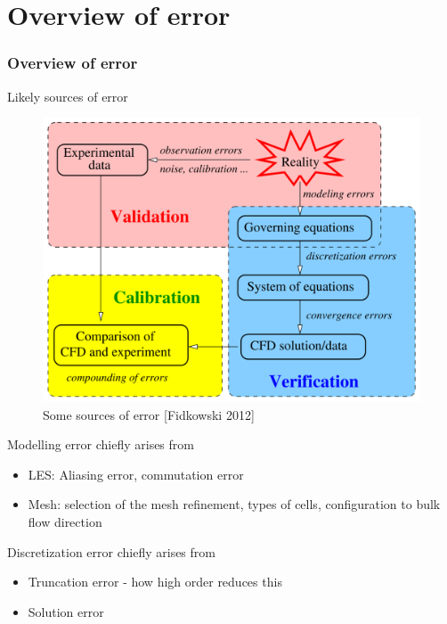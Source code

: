 \documentclass{beamer}
\begin{document}
\section[Error]{Overview of error}
\begin{frame}%
\frametitle{Overview of error}
\vspace{-5pt}
\begin{minipage}[t][0.7\textheight]{1\textwidth}
\scriptsize
\vspace{-20pt}
\begin{block}{Likely sources of error}
\vspace{-10pt}
\begin{figure}[h!]
\includegraphics[height=0.47\textwidth]{./figs/Error.png}
\vspace{-5pt}
\caption{Some sources of error [Fidkowski 2012]}
\label{fig:Fidk}
\end{figure}
\vspace{-20pt}
\end{block}
\end{minipage}

\vspace{-5pt}
\tiny
Modelling error chiefly arises from
\begin{itemize}
\item LES: Aliasing error, commutation error
\item Mesh: selection of the mesh refinement, types of cells, configuration to bulk flow direction
\end{itemize}
Discretization error chiefly arises from
\begin{itemize}
\item Truncation error - how high order reduces this
\item Solution error
\end{itemize}
\end{frame}


\end{document}
